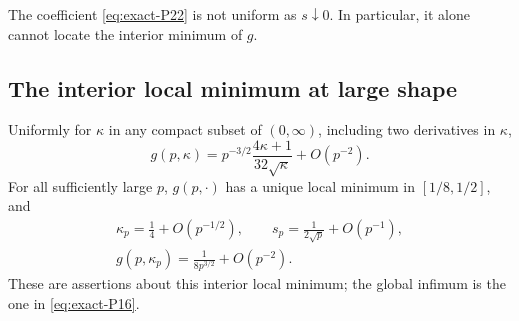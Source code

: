 The coefficient \eqref{eq:exact-P22} is not uniform as \(s\downarrow0\). In particular, it alone cannot locate the interior minimum of \(g\).

\subsection{The interior local minimum at large shape}

\begin{proposition}\label{prop:exact-P8} Uniformly for \(\kappa\) in any compact subset of \((0,\infty)\), including two derivatives in \(\kappa\),
\begin{equation}
 g(p,\kappa)
 =p^{-3/2}\frac{4\kappa+1}{32\sqrt\kappa}+O(p^{-2}).
                                                               \label{eq:exact-P25}
\end{equation}
For all sufficiently large \(p\), \(g(p,\cdot)\) has a unique local minimum in \([1/8,1/2]\), and
\begin{equation}
\begin{gathered}
 \kappa_p=\frac14+O(p^{-1/2}),\qquad
 s_p=\frac1{2\sqrt p}+O(p^{-1}),\\
 g(p,\kappa_p)=\frac1{8p^{3/2}}+O(p^{-2}).             \label{eq:exact-P26}
\end{gathered}
\end{equation}
These are assertions about this interior local minimum; the global infimum is the one in \eqref{eq:exact-P16}.

\end{proposition}
